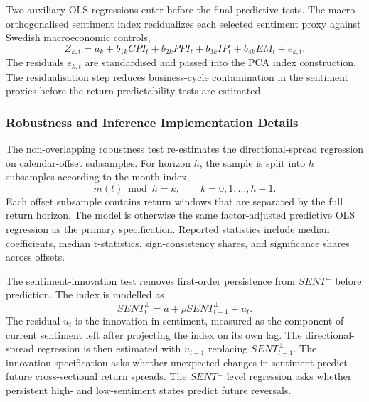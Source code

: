 \documentclass[11pt]{article}
\newcommand{\var}[1]{\ensuremath{#1}}
\begin{document}
Two auxiliary OLS regressions enter before the final predictive tests. The macro-orthogonalised sentiment index residualizes each selected sentiment proxy against Swedish macroeconomic controls,
\begin{equation}
    Z_{k,t}
    =
    a_k
    + b_{1k} CPI_t
    + b_{2k} PPI_t
    + b_{3k} IP_t
    + b_{4k} EM_t
    + e_{k,t}.
\end{equation}
The residuals \var{e_{k,t}} are standardised and passed into the PCA index construction. The residualisation step reduces business-cycle contamination in the sentiment proxies before the return-predictability tests are estimated.

\subsubsection{Robustness and Inference Implementation Details}
\label{app:robustness_implementation_details}

The non-overlapping robustness test re-estimates the directional-spread regression on calendar-offset subsamples. For horizon \var{h}, the sample is split into \var{h} subsamples according to the month index,
\begin{equation}
    m(t) \bmod h = k,
    \qquad
    k = 0,1,\ldots,h-1.
\end{equation}
Each offset subsample contains return windows that are separated by the full return horizon. The model is otherwise the same factor-adjusted predictive OLS regression as the primary specification. Reported statistics include median coefficients, median t-statistics, sign-consistency shares, and significance shares across offsets.

The sentiment-innovation test removes first-order persistence from \var{SENT^{\perp}} before prediction. The index is modelled as
\begin{equation}
    SENT^{\perp}_{t}
    =
    a
    +
    \rho SENT^{\perp}_{t-1}
    +
    u_t.
\end{equation}
The residual \var{u_t} is the innovation in sentiment, measured as the component of current sentiment left after projecting the index on its own lag. The directional-spread regression is then estimated with \var{u_{t-1}} replacing \var{SENT^{\perp}_{t-1}}. The innovation specification asks whether unexpected changes in sentiment predict future cross-sectional return spreads. The \var{SENT^{\perp}} level regression asks whether persistent high- and low-sentiment states predict future reversals.
\end{document}
